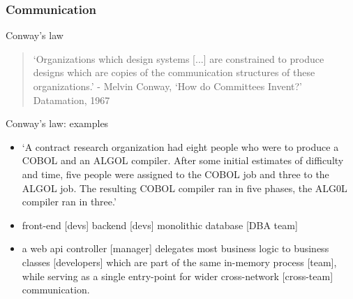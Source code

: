\documentclass{beamer}
\begin{document}
	\subsubsection{Communication}
	\begin{frame}{Conway's law}
		\begin{quote}
			`Organizations which design systems [...] are constrained to produce designs which are copies of the communication structures of these organizations.' - Melvin Conway, `How do Committees Invent?' Datamation, 1967
		\end{quote}
	\end{frame}
	\begin{frame}{Conway's law: examples}
		\begin{itemize}
			\item `A contract research organization had eight people who were to produce a COBOL and an ALGOL compiler. After some initial estimates of difficulty and time, five people were assigned to the COBOL job and three to the ALGOL job. The resulting COBOL compiler ran in five phases, the ALG0L compiler ran in three.' \pause
			\item front-end [devs] backend [devs] monolithic database [DBA team] \pause
			\item a web api controller [manager]  delegates most business logic to business classes [developers] which are part of the same in-memory process [team], while serving as a single entry-point for wider cross-network [cross-team] communication.
		\end{itemize}
	\end{frame}
\end{document}
